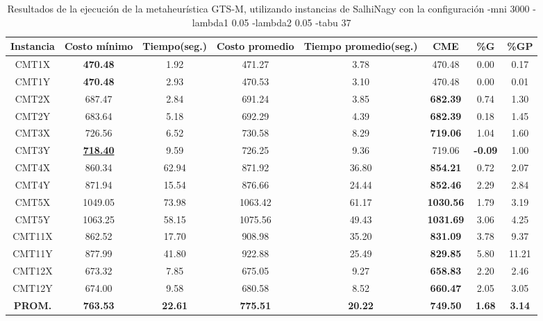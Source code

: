 \begin{table}[h]
\caption{Resultados de la ejecución de la metaheurística GTS-M, utilizando instancias de SalhiNagy con la configuración -mni 3000 -lambda1 0.05 -lambda2 0.05 -tabu 37}
\centering
\small
\begin{tabular}{c c c c c c c c}
\hline\hline
Instancia & Costo mínimo & Tiempo(seg.) & Costo promedio & Tiempo promedio(seg.) & CME & \%G & \%GP \\ [0.5ex]
\hline
CMT1X & \bf{470.48} & 1.92 & 
471.27 & 3.78 & 470.48 & 0.00
 & 0.17\\CMT1Y & \bf{470.48} & 2.93 & 
470.53 & 3.10 & 470.48 & 0.00
 & 0.01\\CMT2X & 687.47 & 2.84 & 
691.24 & 3.85 & \bf{682.39} & 
0.74 & 1.30\\CMT2Y & 683.64 & 5.18 & 
692.29 & 4.39 & \bf{682.39} & 
0.18 & 1.45\\CMT3X & 726.56 & 6.52 & 
730.58 & 8.29 & \bf{719.06} & 
1.04 & 1.60\\CMT3Y & \bf{\underline{718.40}} & 9.59 & 
726.25 & 9.36 & 719.06 & 
\bf{-0.09} & 1.00\\CMT4X & 860.34 & 62.94 & 
871.92 & 36.80 & \bf{854.21} & 
0.72 & 2.07\\CMT4Y & 871.94 & 15.54 & 
876.66 & 24.44 & \bf{852.46} & 
2.29 & 2.84\\CMT5X & 1049.05 & 73.98 & 
1063.42 & 61.17 & \bf{1030.56} & 
1.79 & 3.19\\CMT5Y & 1063.25 & 58.15 & 
1075.56 & 49.43 & \bf{1031.69} & 
3.06 & 4.25\\CMT11X & 862.52 & 17.70 & 
908.98 & 35.20 & \bf{831.09} & 
3.78 & 9.37\\CMT11Y & 877.99 & 41.80 & 
922.88 & 25.49 & \bf{829.85} & 
5.80 & 11.21\\CMT12X & 673.32 & 7.85 & 
675.05 & 9.27 & \bf{658.83} & 
2.20 & 2.46\\CMT12Y & 674.00 & 9.58 & 
680.58 & 8.52 & \bf{660.47} & 
2.05 & 3.05\\\bf{PROM.} & 
\bf{763.53} & \bf{22.61} & \bf{775.51} & \bf{20.22} & \bf{749.50} & \bf{1.68} & \bf{3.14}\\[1ex]\hline
\end{tabular}
\label{table:nonlin}
\end{table}
